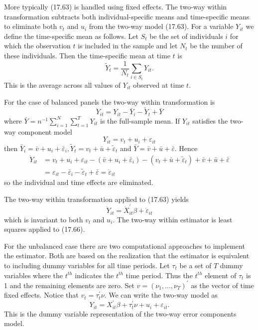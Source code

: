 \documentclass[10pt]{article}
\begin{document}
More typically (17.63) is handled using fixed effects. The two-way within transformation subtracts both individual-specific means and time-specific means to eliminate both $v_{t}$ and $u_{i}$ from the two-way model (17.63). For a variable $Y_{i t}$ we define the time-specific mean as follows. Let $S_{t}$ be the set of individuals $i$ for which the observation $t$ is included in the sample and let $N_{t}$ be the number of these individuals. Then the time-specific mean at time $t$ is
$$
\widetilde{Y}_{t}=\frac{1}{N_{t}} \sum_{i \in S_{t}} Y_{i t} .
$$
This is the average across all values of $Y_{i t}$ observed at time $t$.

For the case of balanced panels the two-way within transformation is
$$
\ddot{Y}_{i t}=Y_{i t}-\bar{Y}_{i}-\widetilde{Y}_{t}+\bar{Y}
$$
where $\bar{Y}=n^{-1} \sum_{i=1}^{N} \sum_{t=1}^{T} Y_{i t}$ is the full-sample mean. If $Y_{i t}$ satisfies the two-way component model
$$
Y_{i t}=v_{t}+u_{i}+\varepsilon_{i t}
$$
then $\bar{Y}_{i}=\bar{v}+u_{i}+\bar{\varepsilon}_{i}, \widetilde{Y}_{t}=v_{t}+\bar{u}+\widetilde{\varepsilon}_{t}$ and $\bar{Y}=\bar{v}+\bar{u}+\bar{\varepsilon}$. Hence
$$
\begin{aligned}
\ddot{Y}_{i t} &=v_{t}+u_{i}+\varepsilon_{i t}-\left(\bar{v}+u_{i}+\bar{\varepsilon}_{i}\right)-\left(v_{t}+\bar{u}+\widetilde{\varepsilon}_{t}\right)+\bar{v}+\bar{u}+\bar{\varepsilon} \\
&=\varepsilon_{i t}-\bar{\varepsilon}_{i}-\widetilde{\varepsilon}_{t}+\bar{\varepsilon}=\ddot{\varepsilon}_{i t}
\end{aligned}
$$
so the individual and time effects are eliminated.

The two-way within transformation applied to (17.63) yields
$$
\ddot{Y}_{i t}=\ddot{X}_{i t}^{\prime} \beta+\ddot{\varepsilon}_{i t}
$$
which is invariant to both $v_{t}$ and $u_{i}$. The two-way within estimator is least squares applied to (17.66).

For the unbalanced case there are two computational approaches to implement the estimator. Both are based on the realization that the estimator is equivalent to including dummy variables for all time periods. Let $\tau_{t}$ be a set of $T$ dummy variables where the $t^{t h}$ indicates the $t^{t h}$ time period. Thus the $t^{t h}$ element of $\tau_{t}$ is 1 and the remaining elements are zero. Set $v=\left(\nu_{1}, \ldots, \nu_{T}\right)^{\prime}$ as the vector of time fixed effects. Notice that $v_{t}=\tau_{t}^{\prime} \nu$. We can write the two-way model as
$$
Y_{i t}=X_{i t}^{\prime} \beta+\tau_{t}^{\prime} \nu+u_{i}+\varepsilon_{i t} .
$$
This is the dummy variable representation of the two-way error components model.
\end{document}
